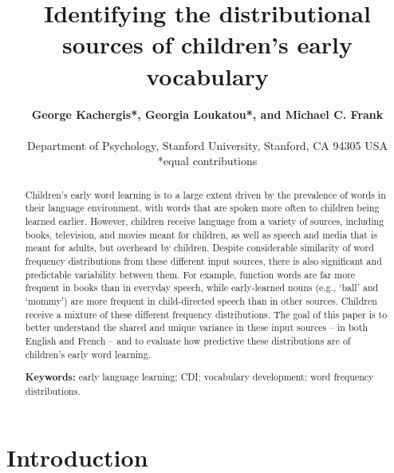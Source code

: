 \documentclass[10pt, letterpaper]{article}
\title{Identifying the distributional sources of children's early
vocabulary}
\author{{\large \bf George Kachergis*, Georgia Loukatou*, and Michael C. Frank } \AND {\large \bf  {kachergis, loukatou, mcfrank}@stanford.edu} \\  \newline\\ Department of Psychology, Stanford University, Stanford, CA 94305 USA\\ *equal contributions}
\begin{document}
\maketitle

\begin{abstract}
Children's early word learning is to a large extent driven by the
prevalence of words in their language environment, with words that are
spoken more often to children being learned earlier. However, children
receive language from a variety of sources, including books, television,
and movies meant for children, as well as speech and media that is meant
for adults, but overheard by children. Despite considerable similarity
of word frequency distributions from these different input sources,
there is also significant and predictable variability between them. For
example, function words are far more frequent in books than in everyday
speech, while early-learned nouns (e.g., `ball' and `mommy') are more
frequent in child-directed speech than in other sources. Children
receive a mixture of these different frequency distributions. The goal
of this paper is to better understand the shared and unique variance in
these input sources -- in both English and French -- and to evaluate how
predictive these distributions are of children's early word learning.

\textbf{Keywords:}
early language learning; CDI; vocabulary development; word frequency
distributions.
\end{abstract}

\hypertarget{introduction}{%
\section{Introduction}\label{introduction}}
\end{document}
